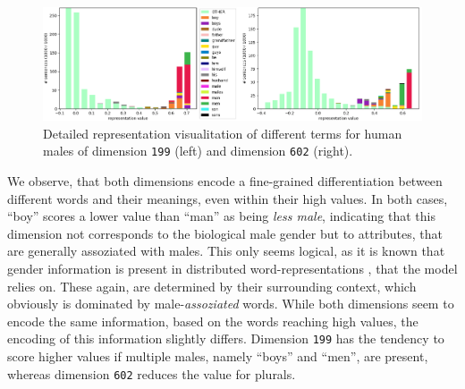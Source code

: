 \begin{figure}[tph!]
\centering
	\includegraphics[totalheight=4.5cm]{fig/mf_detailed.png}
	\caption{Detailed representation visualitation of different terms for human males of dimension \texttt{199} (left) and dimension \texttt{602} (right).}
	\label{fig:mf_detailed_m}
\end{figure}
We observe, that both dimensions encode a fine-grained differentiation between different words and their meanings, even within their high values. In both cases, ``boy'' scores a lower value than ``man'' as being \textit{less male}, indicating that this dimension not corresponds to the biological male gender but to attributes, that are generally assoziated with males. This only seems logical, as it is known that gender information is present in distributed word-representations \citep{mikolov2013linguistic}, that the model relies on. These again, are determined by their surrounding context, which obviously is dominated by male-\textit{assoziated} words. While both dimensions seem to encode the same information, based on the words reaching high values, the encoding of this information slightly differs. Dimension \texttt{199} has the tendency to score higher values if multiple males, namely ``boys'' and ``men'', are present, whereas dimension \texttt{602} reduces the value for plurals. 
\newline

